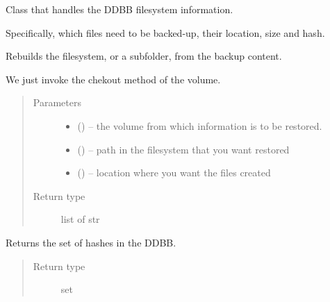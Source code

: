 \documentclass[letterpaper,10pt,english]{sphinxmanual}
\begin{document}
\begin{fulllineitems}
\label{\detokenize{index:fsbackup.fileDB.FileDB}}
Class that handles the DDBB filesystem information.

Specifically, which files need to be backed-up, their location, size and hash.

\begin{fulllineitems}
\label{\detokenize{index:fsbackup.fileDB.FileDB.checkout}}
Rebuilds the filesystem, or a subfolder, from the backup content.

We just invoke the chekout method of the volume.
\begin{quote}\begin{description}
\item[{Parameters}] \leavevmode\begin{itemize}
\item {} 
 ({\hyperref[\detokenize{index:fsbackup.hashVolume.HashVolume}]{}}) -- the volume from which information is to be restored.

\item {} 
 () -- path in the filesystem that you want restored

\item {} 
 () -- location where you want the files created

\end{itemize}

\item[{Return type}] \leavevmode
list of str

\end{description}\end{quote}

\end{fulllineitems}


\begin{fulllineitems}
\label{\detokenize{index:fsbackup.fileDB.FileDB.hashesSet}}
Returns the set of hashes in the DDBB.
\begin{quote}\begin{description}
\item[{Return type}] \leavevmode
set


\end{description}
\end{quote}
\end{fulllineitems}
\end{fulllineitems}
\end{document}
